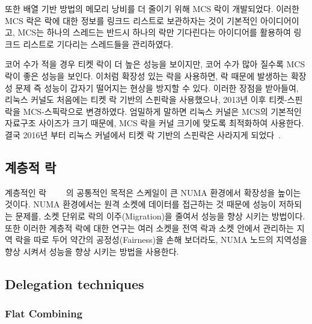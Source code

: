 또한 배열 기반 방법의 메모리 낭비를 더 줄이기 위해 MCS 락이 개발되었다. 
이러한 MCS 락은 락에 대한 정보를 링크드 리스트로 보관하자는 것이 기본적인 아이디어이고, 
MCS는 하나의 스레드는 반드시 하나의 락만 기다린다는
아이디어를 활용하여 링크드 리스트로 기다리는 스레드들을 관리하였다. 
 
코어 수가 적을 경우 티켓 락이 더 높은 성능을 보이지만, 
코어 수가 많아 질수록 MCS 락이 좋은 성능을 보인다. 
이처럼 확장성 있는 락을 사용하면, 락 때문에 발생하는 확장성 문제 즉 성능이 갑자기 떨어지는 현상을 
방지할 수 있다.
이러한 장점을 받아들여, 리눅스 커널도 처음에는 티켓 락 기반의 스핀락을 사용했으나, 
2013년 이후 티켓-스핀락을 MCS-스픽락으로 변경하였다. 
엄밀하게 말하면 리눅스 커널은 MCS의 기본적인 자료구조 사이즈가 크기 때문에, MCS 락을 커널 크기에 
맞도록 최적화하여 사용한다. 
결국 2016년 부터 리눅스 커널에서 티켓 락 기반의 스핀락은 사라지게 되었다~\cite{ticket}.
 
\subsection{계층적 락}

계층적인 락~\cite{Radovic2003HBL}~\cite{Chabbi2016CLL}~\cite{Luchangco2006HCQ}
~\cite{Chabbi2015HPL}의 공통적인 목적은 스케일이 큰 NUMA 환경에서 확장성을 높이는 것이다.  
NUMA 환경에서는 원격 소켓에 데이터를 접근하는 것 때문에 성능이 저하되는 문제를,
소켓 단위로 락의 이주(Migration)을 줄여서 성능을 향상 시키는 방법이다.
또한 이러한 계층적 락에 대한 연구는 여러 소켓을 전역 락과 소켓 안에서 관리하는
지역 락을 따로 두어 약간의 공정성(Fairness)을 손해 보더라도, 
NUMA 노드의 지역성을 향상 시켜서 성능을 향상 시키는 방법을 사용한다.

\subsection{Delegation techniques}

\subsubsection{Flat Combining}

